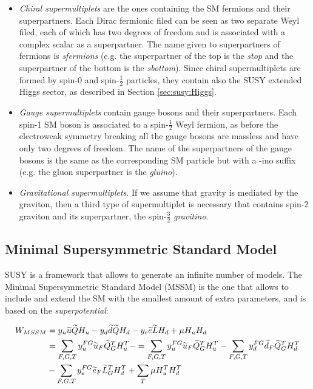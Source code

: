 \begin{itemize}
\item \textit{Chiral supermultiplets} are the ones containing the SM fermions and their superpartners. Each Dirac fermionic filed can be seen as two separate Weyl filed, each of which has two degrees of freedom and is associated with a complex scalar as a superpartner. The name given to superpartners of fermions is \textit{sfermions} (e.g. the superpartner of the top is the \textit{stop} and the superpartner of the bottom is the \textit{sbottom}). Since chiral supermultiplets are formed by spin-0 and spin-$\frac{1}{2}$ particles, they contain also the SUSY extended Higgs sector, as described in Section \ref{sec:susy:Higgs}.

\item \textit{Gauge supermultiplets} contain gauge bosons and their superpartners. Each spin-1 SM boson is associated to a spin-$\frac{1}{2}$ Weyl fermion, as before the electroweak symmetry breaking all the gauge bosons are massless and have only two degrees of freedom. The name of the superpartners of the gauge bosons is the same as the corresponding SM particle but with a -ino suffix (e.g. the gluon superpartner is the \textit{gluino}). 

\item \textit{Gravitational supermultiplets}. If we assume that gravity is mediated by the graviton, then a third type of supermultiplet is necessary that contains spin-2 graviton and its superpartner, the spin-$\frac{3}{2}$ \textit{gravitino}.

\end{itemize}




\subsection{Minimal Supersymmetric Standard Model}

SUSY is a framework that allows to generate an infinite number of models. The Minimal Supersymmetric Standard Model (MSSM) is the one that allows to include and extend the SM with the smallest amount of extra parameters, and is based on the \textit{superpotential}:

\begin{equation}
\begin{aligned}
W_{MSSM} & = y_u \widetilde{u} \widetilde{Q} H_u - y_d \widetilde{d}\widetilde{Q} H_d - y_e \widetilde{e} \widetilde{L}H_d + \mu H_u H_d \\  
& = \sum_{F, G, T} y_u^{FG} \widetilde{u}_F \widetilde{Q}_G^T H_u^T -
 = \sum_{F, G, T} y_u^{FG} \widetilde{u}_F \widetilde{Q}_G^T H_u^T - 
   \sum_{F, G, T} y_d^{FG} \widetilde{d}_F \widetilde{Q}_G^T H_d^T   \\ 
   & -
   \sum_{F, G, T} y_e^{FG} \widetilde{e}_F\widetilde{L}_G^T H_d^T  +
   \sum_{T} \mu H_u^T H_d^T 
\end{aligned}
\label{eq:WMMS}
\end{equation}

